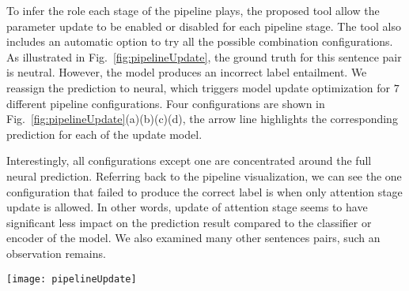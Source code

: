 To infer the role each stage of the pipeline plays, the proposed tool allow the parameter update to be enabled or disabled for each pipeline stage.
The tool also includes an automatic option to try all the possible combination configurations. As illustrated in Fig.~\ref{fig:pipelineUpdate}, the ground truth for this sentence pair is neutral. However, the model produces an incorrect label entailment. We reassign the prediction to neural, which triggers model update optimization for $7$ different pipeline configurations. Four configurations are shown in Fig.~\ref{fig:pipelineUpdate}(a)(b)(c)(d), the arrow line highlights the corresponding prediction for each of the update model.

Interestingly, all configurations except one are concentrated around the full neural prediction. Referring back to the pipeline visualization, we can see the one configuration that failed to produce the correct label is when only attention stage update is allowed.
%
In other words, update of attention stage seems to have significant less impact on the prediction result compared to the classifier or encoder of the model. 
We also examined many other sentences pairs, such an observation remains.  

%



\begin{figure*}[t]
\centering
\vspace{-2mm}
 \texttt{[image: pipelineUpdate]}
 \caption{
How changes in different stage impact the prediction.
 }
\label{fig:pipelineUpdate}
\end{figure*}


